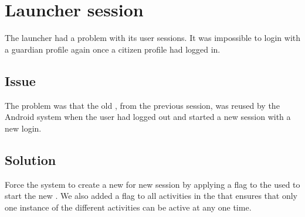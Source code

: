 
\section{Launcher session}
\label{sec:launcher_session_issues}

The launcher had a problem with its user sessions. It was impossible to login with a guardian profile again once a citizen profile had logged in.  

\subsection{Issue}

The problem was that the old , from the previous session, was reused by the Android system when the user had logged out and started a new session with a new login.

\subsection{Solution}

Force the system to create a new  for new session by applying a flag to the  used to start the new . We also added a flag to all activities in the \launcher that ensures that only one instance of the different activities can be active at any one time.
